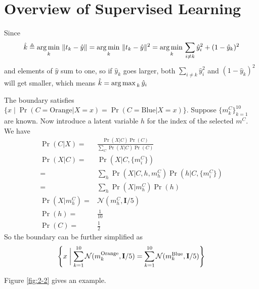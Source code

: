 \section{Overview of Supervised Learning}

\begin{sol}
Since
\[
\hat{k}\triangleq\operatorname*{arg\,min\,}_k\|t_k-\hat{y}\|=\operatorname*{arg\,min\,}_k\|t_k-\hat{y}\|^2=\operatorname*{arg\,min\,}_k\sum_{i\ne k}\hat{y}_i^2+(1-\hat{y}_k)^2
\]
and elements of $\hat{y}$ sum to one, so if $\hat{y}_k$ goes larger, both $\sum_{i\ne k}\hat{y}_i^2$ and $(1-\hat{y}_k)^2$ will get smaller, which means $\hat{k}=\operatorname*{arg\,max\,}_k\hat{y}_i$ 
\end{sol}

\begin{sol}
The boundary satisfies $\{x\mid \Pr(C=\mathrm{Orange}\vert X=x) =\Pr(C=\mathrm{Blue}\vert X=x)\}$. Suppose $\{m_k^C\}_{k=1}^{10}$ are known. Now introduce a latent variable $h$ for the index of the selected $m^C$. We have
\begin{align*}
\Pr(C\vert X) =& \frac{\Pr(X\vert C)\Pr(C)}{\sum_C\Pr(X\vert C)\Pr(C)}\\
\Pr(X\vert C) =& \Pr(X\vert C,\{m_i^C\})\\
=& \sum_h\Pr(X\vert C,h,m_h^C)\Pr(h\vert C,\{m_i^C\})\\
=& \sum_h\Pr(X\vert m_h^C)\Pr(h)\\
\Pr(X\vert m_h^C) =& \mathcal{N}(m_h^C,\mathbf{I}/5)\\
\Pr(h) =& \frac{1}{10}\\
\Pr(C) =& \frac{1}{2}
\end{align*}
So the boundary can be further simplified as
\[
\left\{x\biggm| \sum_{k=1}^{10} \mathcal{N}(m_k^\mathrm{Orange},\mathbf{I}/5)=\sum_{k=1}^{10} \mathcal{N}(m_k^\mathrm{Blue},\mathbf{I}/5)\right\}
\]

Figure \ref{fig:2-2} gives an example.


\end{sol}
